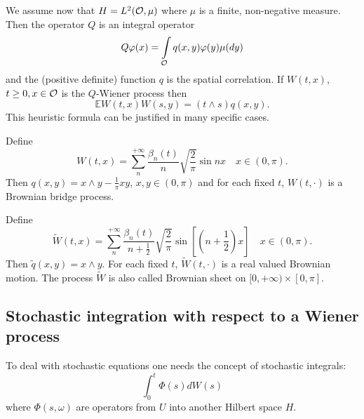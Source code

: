 \documentclass[preprint]{imsart}
\def\E{\mathbb E}
\begin{document}
{We assume now that $H = L^2({\cal O},\mu)$ where $\mu$ is a finite,
non-negative measure.  Then the operator $Q$ is an integral operator
$$
Q\varphi(x) = \int\limits_{{\cal O}} q(x,y) \varphi(y) \mu(dy)
$$
and the (positive definite) function $q$ is the spatial correlation.  If
$W(t,x)$, $t \geq 0, x \in {\cal O}$ is the $Q$-Wiener process then
$$
\E W(t,x) W(s,y) = (t \wedge s) q(x,y).
$$
This heuristic formula can be justified in many specific cases.
\vspace{2mm}

 Define
$$
    W(t,x) = \sum_{n}^{+\infty} \frac{\beta_n(t)}{n} \sqrt{\frac{2}{\pi}} \sin nx
    \quad x \in (0,\pi).
$$
Then $q(x,y) = x \wedge y - \frac{1}{\pi} xy$, $x,y \in (0,\pi)$ and for each
fixed $t$, $W(t,\cdot)$ is a Brownian bridge process.
\vspace{2mm}

\noindent Define
$$
    \widetilde{W}(t,x) = \sum_{n}^{+\infty} \frac{\beta_n(t)}{n+\frac12}
    \sqrt{\frac{2}{\pi}} \sin \left[ \left(n+\frac12\right) x \right]
    \quad x \in (0,\pi).
$$
Then $\widetilde{q}(x,y) = x \wedge y$.  For each fixed $t$,
$\widetilde{W}(t,\cdot)$ is a real valued Brownian motion.  The process
$\widetilde{W}$ is also called Brownian sheet on $[0,+\infty) \times [0,\pi]$.



\subsection{Stochastic integration with respect to a Wiener process}
To deal with stochastic equations one needs the concept of stochastic
integrals:
$$
\int_0^t \Phi(s) dW(s)
$$
where $\Phi(s,\omega)$ are operators from $U$ into another Hilbert space $H$.
\vspace{2mm}

}
\end{document}
